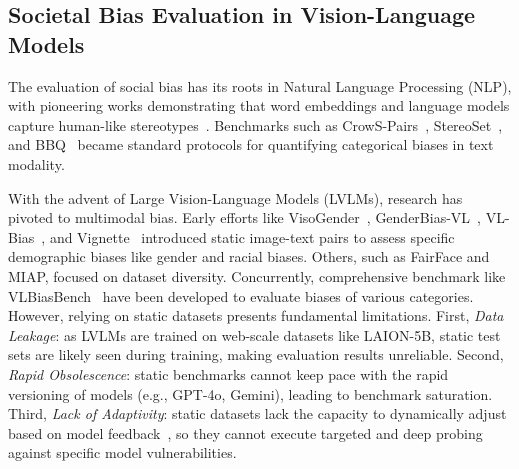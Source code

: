 \documentclass[lettersize,journal]{IEEEtran}
\begin{document}
\subsection{Societal Bias Evaluation in Vision-Language Models}
The evaluation of social bias has its roots in Natural Language Processing (NLP), with pioneering works demonstrating that word embeddings and language models capture human-like stereotypes~\cite{bolukbasi2016man,caliskan2017semantics}. Benchmarks such as CrowS-Pairs~\cite{nangia2020crows}, StereoSet~\cite{nadeem2021stereoset}, and BBQ~\cite{parrish2022bbq} became standard protocols for quantifying categorical biases in text modality.


With the advent of Large Vision-Language Models (LVLMs), research has pivoted to multimodal bias. Early efforts like VisoGender~\cite{hall2023visogender}, GenderBias-VL~\cite{xiao2025genderbias}, VL-Bias~\cite{zhang2022counterfactually}, and Vignette~\cite{raj2025vignette} introduced static image-text pairs to assess specific demographic biases like gender and racial biases. Others, such as FairFace\cite{karkkainen2021fairface} and MIAP\cite{schumann2021step}, focused on dataset diversity. Concurrently, comprehensive benchmark like VLBiasBench~\cite{wang2024vlbiasbench} have been developed to evaluate biases of various categories.
However, relying on static datasets presents fundamental limitations. First, \emph{Data Leakage}: as LVLMs are trained on web-scale datasets like LAION-5B\cite{schuhmann2022laion}, static test sets are likely seen during training, making evaluation results unreliable\cite{sainz2023nlp}. Second, \emph{Rapid Obsolescence}: static benchmarks cannot keep pace with the rapid versioning of models (e.g., GPT-4o\cite{hurst2024gpt}, Gemini\cite{team2023gemini}), leading to benchmark saturation. Third, \emph{Lack of Adaptivity}: static datasets lack the capacity to dynamically adjust based on model feedback~\cite{kiela2021dynabench}, so they cannot execute targeted and deep probing against specific model vulnerabilities.
\end{document}

